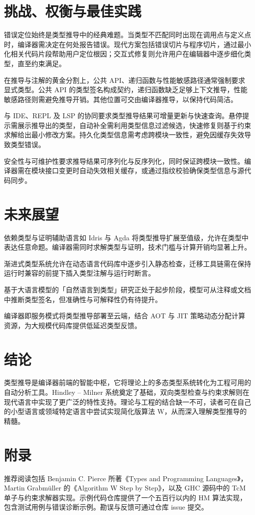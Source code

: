 \chapter{挑战、权衡与最佳实践}
错误定位始终是类型推导中的经典难题。当类型不匹配同时出现在调用点与定义点时，编译器需决定在何处报告错误。现代方案包括错误切片与程序切片，通过最小化相关代码片段帮助用户定位根因；交互式修复则允许用户在编辑器中逐步细化类型，直至约束满足。\par
在推导与注解的黄金分割上，公共 API、递归函数与性能敏感路径通常强制要求显式类型。公共 API 的类型签名构成契约，递归函数缺乏足够上下文推导，性能敏感路径则需避免推导开销。其他位置可交由编译器推导，以保持代码简洁。\par
与 IDE、REPL 及 LSP 的协同要求类型推导结果可增量更新与快速查询。悬停提示需展示推导出的类型，自动补全需利用类型信息过滤候选，快速修复则基于约束求解给出最小修改方案。持久化类型信息需考虑跨模块一致性，避免因缓存失效导致类型错误。\par
安全性与可维护性要求推导结果可序列化与反序列化，同时保证跨模块一致性。编译器需在模块接口变更时自动失效相关缓存，或通过指纹校验确保类型信息与源代码同步。\par
\chapter{未来展望}
依赖类型与证明辅助语言如 Idris 与 Agda 将类型推导扩展至值级，允许在类型中表达任意命题。编译器需同时求解类型与证明，技术门槛与计算开销均显著上升。\par
渐进式类型系统允许在动态语言代码库中逐步引入静态检查，迁移工具链需在保持运行时兼容的前提下插入类型注解与运行时断言。\par
基于大语言模型的「自然语言到类型」研究正处于起步阶段，模型可从注释或文档中推断类型签名，但准确性与可解释性仍有待提升。\par
编译器即服务模式将类型推导部署至云端，结合 AOT 与 JIT 策略动态分配计算资源，为大规模代码库提供低延迟类型反馈。\par
\chapter{结论}
类型推导是编译器前端的智能中枢，它将理论上的多态类型系统转化为工程可用的自动分析工具。Hindley – Milner 系统奠定了基础，双向类型检查与约束求解则在现代语言中实现了更广泛的特性支持。理论与工程的结合缺一不可，读者可在自己的小型语言或领域特定语言中尝试实现简化版算法 W，从而深入理解类型推导的精髓。\par
\chapter{附录}
推荐阅读包括 Benjamin C. Pierce 所著《Types and Programming Languages》，Martin Grabmüller 的《Algorithm W Step by Step》，以及 GHC 源码中的 TcM 单子与约束求解器实现。示例代码仓库提供了一个五百行以内的 HM 算法实现，包含测试用例与错误诊断示例。勘误与反馈可通过仓库 issue 提交。\par
